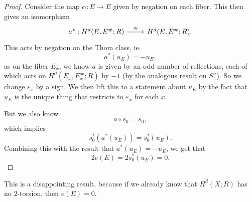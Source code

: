 \documentclass[a4paper]{article}
\begin{document}
\begin{proof}
  Consider the map $\alpha: E \to E$ given by negation on each fiber. This then gives an isomorphism
  \[
    \begin{tikzcd}
      a^*: H^d(E, E^\#; R) \ar[r, "\cong"] & H^d(E, E^\#; R).
    \end{tikzcd}
  \]
  This acts by negation on the Thom class, ie.
  \[
    a^*(u_E) = - u_E,
  \]
  as on the fiber $E_x$, we know $a$ is given by an odd number of reflections, each of which acts on $H^d(E_x, E_x^\#; R)$ by $-1$ (by the analogous result on $S^n$). So we change $\varepsilon_x$ by a sign. We then lift this to a statement about $u_E$ by the fact that $u_E$ is the unique thing that restricts to $\varepsilon_x$ for each $x$.

  But we also know
  \[
    a \circ s_0 = s_0,
  \]
  which implies
  \[
    s_0^*(a^*(u_E)) = s_0^*(u_E).
  \]
  Combining this with the result that $a^*(u_E) = -u_E$, we get that
  \[
    2 e(E) = 2 s_0^*(u_E) = 0.
  \]
\end{proof}
This is a disappointing result, because if we already know that $H^d(X; R)$ has no $2$-torsion, then $e(E) = 0$.
\end{document}
